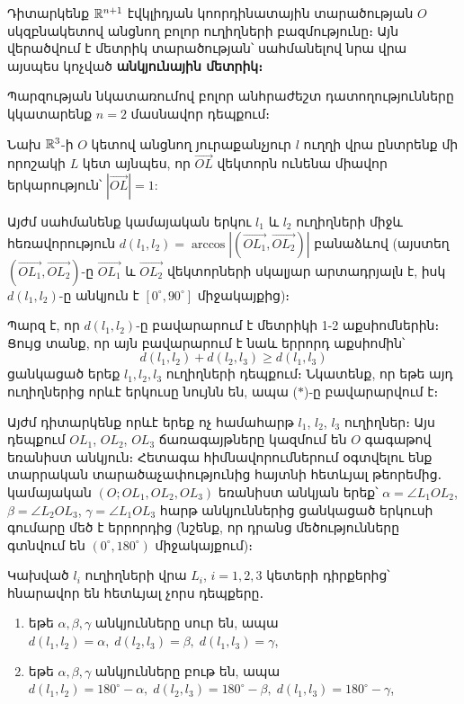 \documentclass[./main.tex]{subfiles}
\begin{document}
\begin{example}\label{ch7ex5}
Դիտարկենք $\mathbb{R}^{n+1}$ էվկլիդյան կոորդինատային տարածության $O$\linebreak  սկզբնակետով անցնող բոլոր ուղիղների բազմությունը։ Այն վերածվում է մետրիկ տարածության՝ սահմանելով նրա վրա այսպես կոչված \textbf{անկյունային մետրիկ։}
\par Պարզության նկատառումով բոլոր անհրաժեշտ դատողությունները կկատարենք $n=2$ մասնավոր դեպքում։
\par Նախ $\mathbb{R}^3$-ի $O$ կետով անցնող յուրաքանչյուր $l$ ուղղի վրա ընտրենք մի որոշակի $L$ կետ այնպես, որ $\overrightarrow{OL}$ վեկտորն ունենա միավոր երկարություն՝ $|\overrightarrow{OL}|=1$:
\par Այժմ սահմանենք կամայական երկու $l_1$ և $l_2$ ուղիղների միջև հեռավորություն $d(l_1,l_2)=\arccos|(\overrightarrow{OL_1}, \overrightarrow{OL_2})|$ բանաձևով (այստեղ $(\overrightarrow{OL_1},\overrightarrow{OL_2})$-ը $\overrightarrow{OL_1}$ և $\overrightarrow{OL_2}$ վեկ\-տորնե\-րի սկալյար արտադրյալն է, իսկ $d(l_1,l_2)$-ը անկյուն է $[0^{\circ},90^{\circ}]$ միջակայքից)։
\par Պարզ է, որ $d(l_1,l_2)$-ը բավարարում է մետրիկի 1-2 աքսիոմներին։ Ցույց տանք, որ այն բավարարում է նաև երրորդ աքսիոմին՝
\begin{equation}
d(l_1,l_2)+d(l_2,l_3)\geq d(l_1,l_3) \tag{$\ast$}
\end{equation}
ցանկացած երեք $l_1,l_2,l_3$ ուղիղների դեպքում։ Նկատենք, որ եթե այդ ուղիղներից որևէ երկուսը նույնն են, ապա ($\ast$)-ը բավարարվում է։
\par Այժմ դիտարկենք որևէ երեք ոչ համահարթ $l_1$, $l_2$, $l_3$ ուղիղներ։ Այս դեպքում $OL_1$, $OL_2$, $OL_3$ ճառագայթները կազմում են $O$ գագաթով եռանիստ անկյուն։ Հե\-տա\-գա հիմ\-նա\-վո\-րում\-ներում օգտվելու ենք տարրական տա\-րա\-ծա\-չա\-փու\-թյու\-նից հայտ\-նի հետև\-յալ թեո\-րե\-մից․ կա\-մա\-յա\-կան $(O; OL_1, OL_2, OL_3)$ եռանիստ անկյան երեք՝ $\alpha = \angle L_1OL_2$, $\beta = \angle L_2OL_3$, $\gamma = \angle L_1OL_3$ հարթ անկյուններից ցանկացած երկուսի գումարը մեծ է երրորդից (նշենք, որ դրանց մեծությունները գտնվում են $(0^{\circ},180^{\circ})$ միջակայքում)։
\par Կախված $l_i$ ուղիղների վրա $L_i$, $i=1,2,3$ կետերի դիրքերից՝ հնարավոր են հե\-տև\-յալ չորս դեպքերը․
\begin{enumerate}
\item եթե $\alpha,\beta,\gamma$ անկյունները սուր են, ապա $d(l_1,l_2)=\alpha,\;d(l_2,l_3)=\beta,\;d(l_1,l_3)=\gamma$,
    
\item եթե $\alpha,\beta,\gamma$ անկյունները բութ են, ապա $d(l_1,l_2)=180^{\circ}-\alpha,\;d(l_2,l_3)=180^{\circ}-\beta,\;d(l_1,l_3)=180^{\circ}-\gamma$,


\end{enumerate}
\end{example}
\end{document}
